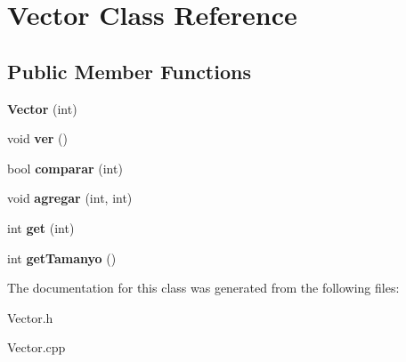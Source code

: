 \hypertarget{class_vector}{}\section{Vector Class Reference}
\label{class_vector}
\subsection*{Public Member Functions}
\begin{DoxyCompactItemize}
\item 
\mbox{\label{class_vector_a9c3b8bbe412b111b521621a86df2c08d}} 
{\bfseries Vector} (int)
\item 
\mbox{\label{class_vector_a10599be8fe7b3fc14ed1333edc4ed598}} 
void {\bfseries ver} ()
\item 
\mbox{\label{class_vector_a6fba8ff444eafc679730f3b793d3dbf5}} 
bool {\bfseries comparar} (int)
\item 
\mbox{\label{class_vector_ab5658d0a6e84c6d7fffb6514079b5a85}} 
void {\bfseries agregar} (int, int)
\item 
\mbox{\label{class_vector_a3b04acc9cbca7f7167635c67df06dcb2}} 
int {\bfseries get} (int)
\item 
\mbox{\label{class_vector_a33993c398645ead09c9f848df3b7492a}} 
int {\bfseries get\+Tamanyo} ()
\end{DoxyCompactItemize}


The documentation for this class was generated from the following files\+:\begin{DoxyCompactItemize}
\item 
Vector.\+h\item 
Vector.\+cpp\end{DoxyCompactItemize}
